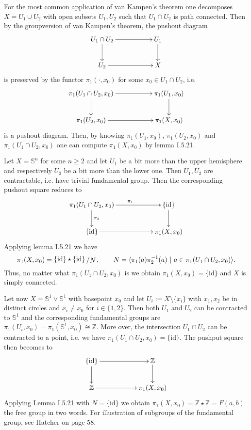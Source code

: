 \documentclass[11pt]{book}
\numberwithin{dummy}{section}
\theoremstyle{nonumberbreak}
\newenvironment{ex}[1][]{\ifthenelse{\equal{#1}{}}{\example}{\example[#1]}\rm}{\endexample}
\newcommand{\id}{\mathrm{id}}
\newcommand{\slant}[2]{{\raisebox{.1em}{$#1$}\left/\raisebox{-.1em}{$#2$}\right.}}
\begin{document}
\begin{spacing}{1.4}
For the most common application of van Kampen's theorem one decomposes $X= U_1 \cup U_2$ with open subsets $U_1, U_2$ such that $U_1 \cap U_2$ is path connected. Then by the groupversion of van Kampen's theorem, the pushout diagram
$$
\begin{xy}
\xymatrix{
U_1 \cap U_2 \ar[rr] \ar[d] && U_1 \ar[d] \\ U_2 \ar[rr] && X 
}
\end{xy}
$$
is preserved by the functor $\pi_1(\cdot, x_0)$ for some $x_0 \in U_1 \cap U_2$, i.e.
$$
\begin{xy}
\xymatrix{
\pi_1(U_1 \cap U_2, x_0) \ar[rr] \ar[d] && \pi_1(U_1, x_0) \ar[d] \\ \pi_1(U_2, x_0) \ar[rr] && \pi_1(X,x_0) }
\end{xy}
$$
is a pushout diagram. Then, by knowing $\pi_1(U_1, x_0)$, $\pi_1(U_2, x_0)$ and $\pi_1(U_1 \cap U_2,x_0)$ one can compute $\pi_1(X, x_0)$ by lemma I.5.21.

\begin{ex}
Let $X= \mathbb{S}^n$ for some $n \geqslant 2$ and let $U_1$ be a bit more than the upper hemisphere and respectively $U_2$ be a bit more than the lower one. Then $U_1, U_2$ are contractable, i.e. have trivial fundamental group. Then the corresponding pushout square reduces to
$$
\begin{xy}
\xymatrix{
\pi_1(U_1 \cap U_2, x_0) \ar[rr]^{\pi_1} \ar[d]^{\pi_2} && \{\id\} \ar[d] \\ \{\id\} \ar[rr] && \pi_1(X,x_0) }
\end{xy}
$$
Applying lemma I.5.21 we have 
$$\pi_1(X,x_0) = \slant{\{ \id\} \star \{ \id\} }{N}, \qquad N= \langle \pi_1(a) \pi_2^{-1}(a) \ \vert \ a \in \pi_1(U_1 \cap U_2, x_0) \rangle.$$
Thus, no matter what $\pi_1(U_1 \cap U_2, x_0)$ is we obtain $\pi_1(X, x_0) = \{\id\}$ and $X$ is simply connected.

\end{ex}



\begin{ex}
Let now $X= \mathbb{S}^1 \lor \mathbb{S}^1$ with basepoint $x_0$ and let $U_i:= X \setminus \{x_i\}$ with $x_1, x_2$ be in distinct circles and $x_i \neq x_0$ for $i \in \{1,2\}$. Then both $U_1$ and $U_2$ can be contracted to $\mathbb{S}^1$ and the corresponding fundamental groups are $\pi_1(U_i, x_0) = \pi_1(\mathbb{S}^1, x_0) \cong \mathbb{Z}$. More over, the intersection $U_1 \cap U_2$ can be contracted to a point, i.e. we have $\pi_1(U_1 \cap U_2, x_0) = \{ \id\}$. The pushput square then becomes to
$$
\begin{xy}
\xymatrix{
\{ \id\} \ar[rr] \ar[d] && \mathbb{Z} \ar[d] \\ \mathbb{Z} \ar[rr] && \pi_1(X,x_0)}
\end{xy}
$$
Applying Lemma I.5.21 with $N= \{ \id\}$ we obtain $\pi_1(X,x_0)= \mathbb{Z} \star \mathbb{Z} = F(a,b)$ the free group in two words.
For illustration of subgroups of the fundamental group, see Hatcher on page 58.




\end{ex}
\end{spacing}
\end{document}
